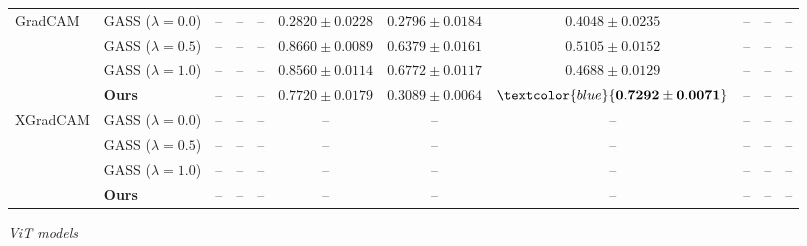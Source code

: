 \begin{table}[t]
{\begin{tabular}{ll|ccc|ccc|ccc}
\multirow{4}{*}{GradCAM}
& GASS ($\lambda=0.0$) & -- & -- & -- & $0.2820 \pm 0.0228$ & $\mathbf{0.2796 \pm 0.0184}$ & $0.4048 \pm 0.0235$ & -- & -- & -- \\
& GASS ($\lambda=0.5$) & -- & -- & -- & $\mathbf{0.8660 \pm 0.0089}$ & $0.6379 \pm 0.0161$ & $0.5105 \pm 0.0152$ & -- & -- & -- \\
& GASS ($\lambda=1.0$) & -- & -- & -- & $0.8560 \pm 0.0114$ & $0.6772 \pm 0.0117$ & $0.4688 \pm 0.0129$ & -- & -- & -- \\
& \textbf{Ours} & -- & -- & -- & $0.7720 \pm 0.0179$ & $0.3089 \pm 0.0064$ & $\textcolor{blue}{\mathbf{0.7292 \pm 0.0071}}$ & -- & -- & -- \\

\midrule
\multirow{4}{*}{XGradCAM}
& GASS ($\lambda=0.0$) & -- & -- & -- & -- & -- & -- & -- & -- & -- \\
& GASS ($\lambda=0.5$) & -- & -- & -- & -- & -- & -- & -- & -- & -- \\
& GASS ($\lambda=1.0$) & -- & -- & -- & -- & -- & -- & -- & -- & -- \\
& \textbf{Ours} & -- & -- & -- & -- & -- & -- & -- & -- & -- \\

\bottomrule
\end{tabular}
}

\vspace{0.5cm}
\textit{ViT models}\\[0.1cm]
\end{table}
